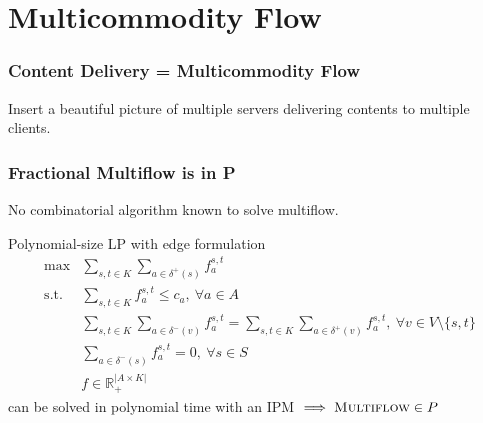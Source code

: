\documentclass{beamer}
\begin{document}
\section{Multicommodity Flow}
\begin{frame}
    \frametitle{Content Delivery = Multicommodity Flow}

    Insert a beautiful picture of multiple servers delivering contents to
    multiple clients.

\end{frame}

\begin{frame}
    \frametitle{Fractional Multiflow is in P}
    
    No combinatorial algorithm known to solve multiflow.

    \begin{block}{Polynomial-size LP with edge formulation}
    \begin{align*}
        \max & \sum_{s,t \in K} \sum_{a \in \delta^+(s)} f_a^{s,t}\\
        \text{s.t.} & \sum_{s,t \in K} f_a^{s,t} \leq c_a, ~\forall a \in A\\
                    & \sum_{s,t\in K} \sum_{a \in \delta^-(v)} f_a^{s,t} =
                      \sum_{s,t \in K} \sum_{a \in \delta^+(v)} f_a^{s,t},
                      ~ \forall v \in V \setminus \{s,t\}\\
                    & \sum_{a \in \delta^-(s)} f_a^{s,t} = 0,
                      ~ \forall s \in S \\
                    & f\in \mathbb{R}_+^{|A \times K|}
    \end{align*}
    can be solved in polynomial time with an IPM $\implies \textsc{Multiflow}
    \in P$
    \end{block}

\end{frame}
\end{document}

